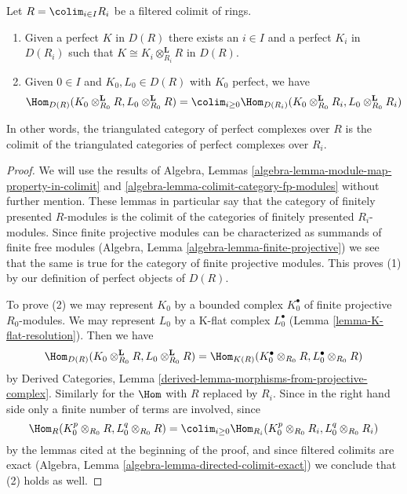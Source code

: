 \begin{lemma}
\label{lemma-colimit-perfect-complexes}
Let $R = \colim_{i \in I} R_i$ be a filtered colimit of rings.
\begin{enumerate}
\item Given a perfect $K$ in $D(R)$ there exists an $i \in I$
and a perfect $K_i$ in $D(R_i)$ such that
$K \cong K_i \otimes_{R_i}^\mathbf{L} R$ in $D(R)$.
\item Given $0 \in I$ and $K_0, L_0 \in D(R)$ with $K_0$ perfect,
we have
$$
\Hom_{D(R)}(K_0 \otimes_{R_0}^\mathbf{L} R, L_0 \otimes_{R_0}^\mathbf{L} R) =
\colim_{i \geq 0}
\Hom_{D(R_i)}(K_0 \otimes_{R_0}^\mathbf{L} R_i,
L_0 \otimes_{R_0}^\mathbf{L} R_i)
$$
\end{enumerate}
In other words, the triangulated category of perfect complexes over $R$
is the colimit of the triangulated categories of perfect complexes over $R_i$.
\end{lemma}

\begin{proof}
We will use the results of
Algebra, Lemmas \ref{algebra-lemma-module-map-property-in-colimit} and
\ref{algebra-lemma-colimit-category-fp-modules}
without further mention. These lemmas in particular say that the
category of finitely presented $R$-modules is the colimit of the
categories of finitely presented $R_i$-modules. Since finite projective
modules can be characterized as summands of finite free modules
(Algebra, Lemma \ref{algebra-lemma-finite-projective}) we see that
the same is true for the category of finite projective modules.
This proves (1) by our definition of perfect objects of $D(R)$.

\medskip\noindent
To prove (2) we may represent $K_0$ by a bounded complex $K_0^\bullet$ of
finite projective $R_0$-modules. We may represent $L_0$ by a K-flat
complex $L_0^\bullet$ (Lemma \ref{lemma-K-flat-resolution}).
Then we have
$$
\Hom_{D(R)}(K_0 \otimes_{R_0}^\mathbf{L} R, L_0 \otimes_{R_0}^\mathbf{L} R) =
\Hom_{K(R)}(K_0^\bullet \otimes_{R_0} R, L_0^\bullet \otimes_{R_0} R)
$$
by Derived Categories, Lemma
\ref{derived-lemma-morphisms-from-projective-complex}.
Similarly for the $\Hom$ with $R$ replaced by $R_i$. Since
in the right hand side only a finite number of terms are involved,
since
$$
\Hom_R(K_0^p \otimes_{R_0} R, L_0^q \otimes_{R_0} R) =
\colim_{i \geq 0}
\Hom_{R_i}(K_0^p \otimes_{R_0} R_i, L_0^q \otimes_{R_0} R_i)
$$
by the lemmas cited at the beginning of the proof, and since
filtered colimits are exact
(Algebra, Lemma \ref{algebra-lemma-directed-colimit-exact})
we conclude that (2) holds as well.
\end{proof}






